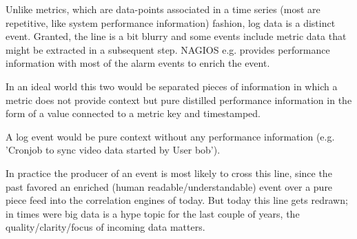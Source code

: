 Unlike metrics, which are data-points associated in a time series (most are repetitive, like system performance information)
fashion, log data is a distinct event. Granted, the line is a bit blurry and some events include metric data that
might be extracted in a subsequent step. NAGIOS e.g. provides performance information with most of the alarm events to enrich the event.

In an ideal world this two would be separated pieces of information in which a metric does not provide context
but pure distilled performance information in the form of a value connected to a metric key and timestamped.

A log event would be pure context without any performance information (e.g. 'Cronjob to sync video data started by User bob'). 

In practice the producer of an event is most likely to cross this line, since the past favored an enriched (human readable/understandable) event over a
pure piece feed into the correlation engines of today. But today this line gets redrawn; in times were big data is a hype topic for the last couple
of years, the quality/clarity/focus of incoming data matters.
